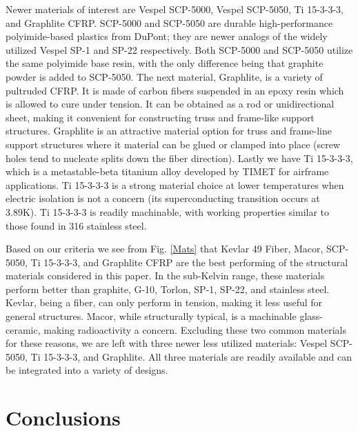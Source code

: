 \documentclass[final]{svjour2}
\begin{document}
Newer materials of interest are Vespel SCP-5000, Vespel SCP-5050, Ti 15-3-3-3, and Graphlite CFRP. SCP-5000 and SCP-5050 are durable high-performance polyimide-based plastics from DuPont; they are newer analogs of the widely utilized Vespel SP-1 and SP-22 respectively.  Both SCP-5000 and SCP-5050 utilize the same polyimide base resin, with the only difference being that graphite powder is added to SCP-5050. The next material, Graphlite, is a variety of pultruded CFRP. It is made of carbon fibers suspended in an epoxy resin which is allowed to cure under tension. It can be obtained as a rod or unidirectional sheet, making it convenient for constructing truss and frame-like support structures.  Graphlite is an attractive material option for truss and frame-line support structures where it material can be glued or clamped into place (screw holes tend to nucleate splits down the fiber direction). Lastly we have Ti 15-3-3-3, which is a metastable-beta titanium alloy developed by TIMET for airframe applications. Ti 15-3-3-3 is a strong material choice at lower temperatures when electric isolation is not a concern (its superconducting transition occurs at 3.89K). Ti 15-3-3-3 is readily machinable, with working properties similar to those found in 316 stainless steel.

Based on our criteria we see from Fig. \ref{Mats} that Kevlar 49 Fiber, Macor, SCP-5050, Ti 15-3-3-3, and Graphlite CFRP are the best performing of the structural materials considered in this paper.  In the sub-Kelvin range, these materials perform better than graphite, G-10, Torlon, SP-1, SP-22, and stainless steel. Kevlar, being a fiber, can only perform in tension, making it less useful for general structures.  Macor, while structurally typical, is a  machinable glass-ceramic, making radioactivity a concern.  Excluding these two common materials for these reasons, we are left with three newer less utilized materials: Vespel SCP-5050, Ti 15-3-3-3, and Graphlite.  All three materials are readily available and can be integrated into a variety of designs.


\section{Conclusions}
\end{document}
